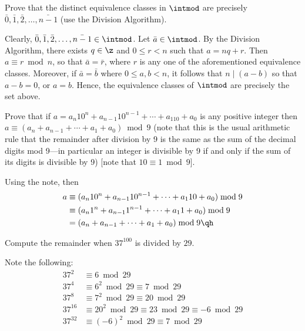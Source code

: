 \begin{problems}
    \item Prove that the distinct equivalence classes in $\intmod$ are precisely $\bar 0, \bar 1, \bar 2, \ldots, \bar{n - 1}$ (use the Division Algorithm).
    \begin{sol}
        Clearly, $\bar 0, \bar 1, \bar 2, \ldots, \bar{n - 1} \in \intmod$. Let $\bar a \in \intmod$. By the Division Algorithm, there exists $q \in \z$ and $0 \leq r < n$ such that $a = nq + r$. Then $a \equiv r \bmod n$, so that $\bar a = \bar r$, where $r$ is any one of the aforementioned equivalence classes. Moreover, if $\bar a = \bar b$ where $0 \leq a, b < n$, it follows that $n \mid (a - b)$ so that $a - b = 0$, or $a = b$. Hence, the equivalence classes of $\intmod$ are precisely the set above.
    \end{sol}
    \item Prove that if $a = a_n10^n + a_{n - 1}10^{n - 1} + \cdots + a_110 + a_0$ is any positive integer then $a \equiv (a_n + a_{n - 1} + \cdots + a_1 + a_0) \bmod 9$ (note that this is the usual arithmetic rule that the remainder after division by 9 is the same as the sum of the decimal digits mod 9—in particular an integer is divisible by 9 if and only if the sum of its digits is divisible by 9) [note that $10 \equiv 1 \bmod 9$].
    \begin{sol}
        Using the note, then
        \begin{align*}
            a & \equiv (a_n10^n + a_{n - 1}10^{n - 1} + \cdots + a_110 + a_0) \bmod 9 \\
            & \equiv (a_n1^n + a_{n - 1}1^{n - 1} + \cdots + a_11 + a_0) \bmod 9 \\
            & = (a_n + a_{n - 1} + \cdots + a_1 + a_0) \bmod 9 \qh
        \end{align*}
    \end{sol}
    \item Compute the remainder when $37^{100}$ is divided by $29$.
    \begin{sol}
        Note the following:
        \begin{align*}
            37^2 & \equiv 6 \bmod 29 \\ 
            37^4 & \equiv 6^2 \bmod 29 \equiv 7 \bmod 29 \\
            37^8 & \equiv 7^2 \bmod 29 \equiv 20 \bmod 29 \\
            37^{16} & \equiv 20^2 \bmod 29 \equiv 23 \bmod 29 \equiv -6 \bmod 29 \\
            37^{32} & \equiv (-6)^2 \bmod 29 \equiv 7 \bmod 29 \\

\end{align*}
\end{sol}
\end{problems}
